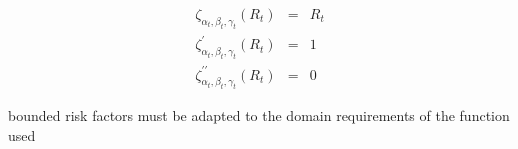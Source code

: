 \documentclass[3pt]{article}
\begin{document}
\begin{eqnarray*}
\zeta _{\alpha _{t},\beta _{t},\gamma _{t}}(R_{t}) &=&R_{t} \\
\zeta _{\alpha _{t},\beta _{t},\gamma _{t}}^{\prime }(R_{t}) &=&1 \\
\zeta _{\alpha _{t},\beta _{t},\gamma _{t}}^{\prime \prime }(R_{t}) &=&0
\end{eqnarray*}

\bigskip 

bounded risk factors must be adapted to the domain requirements of the
function used
\end{document}
